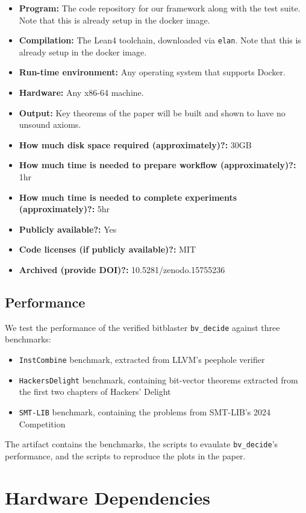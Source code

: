 \documentclass[acmlarge, nonacm]{acmart}
\begin{document}
{\small
\begin{itemize}
  \item {\bf Program: } The code repository for our framework along with the test suite. Note that this is already setup in the docker image.
  \item {\bf Compilation: } The Lean4 toolchain, downloaded via \texttt{elan}. Note that this is already setup in the docker image.
  \item {\bf Run-time environment: } Any operating system that supports Docker.
  \item {\bf Hardware: } Any x86-64 machine.
  \item {\bf Output: } Key theorems of the paper will be built and shown to have no unsound axioms.
  \item {\bf How much disk space required (approximately)?: } 30GB
  \item {\bf How much time is needed to prepare workflow (approximately)?: } 1hr
  \item {\bf How much time is needed to complete experiments (approximately)?: } 5hr
  \item {\bf Publicly available?: } Yes
  \item {\bf Code licenses (if publicly available)?: } MIT
  \item {\bf Archived (provide DOI)?: } 10.5281/zenodo.15755236
\end{itemize}
}


\subsection{Performance}

We test the performance of the verified bitblaster \texttt{bv\_decide} against three benchmarks: 
\begin{itemize}
\item \texttt{InstCombine} benchmark, extracted from LLVM's peephole verifier
\item \texttt{HackersDelight} benchmark, containing bit-vector theorems extracted from the first two chapters of Hackers' Delight
\item \texttt{SMT-LIB} benchmark, containing the problems from SMT-LIB's 2024 Competition
\end{itemize}
The artifact contains the benchmarks, the scripts to evaulate \texttt{bv\_decide}'s performance, and the scripts to reproduce the plots in the paper.

\section{Hardware Dependencies}
\end{document}
